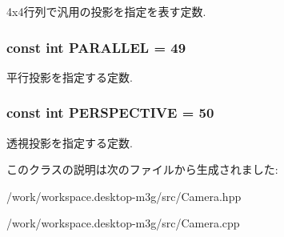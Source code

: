 4x4行列で汎用の投影を指定を表す定数. \hypertarget{classm3g_1_1Camera_d9630da0e9505afbb107c86229aa2f08}{
\subsubsection[{PARALLEL}]{\setlength{\rightskip}{0pt plus 5cm}const int {\bf PARALLEL} = 49}}
\label{classm3g_1_1Camera_d9630da0e9505afbb107c86229aa2f08}


平行投影を指定する定数. \hypertarget{classm3g_1_1Camera_e62e72bde93e7d7ceb482e7a8c40dcf5}{
\subsubsection[{PERSPECTIVE}]{\setlength{\rightskip}{0pt plus 5cm}const int {\bf PERSPECTIVE} = 50}}
\label{classm3g_1_1Camera_e62e72bde93e7d7ceb482e7a8c40dcf5}


透視投影を指定する定数. 

このクラスの説明は次のファイルから生成されました:\begin{CompactItemize}
\item 
/work/workspace.desktop-m3g/src/Camera.hpp\item 
/work/workspace.desktop-m3g/src/Camera.cpp\end{CompactItemize}
